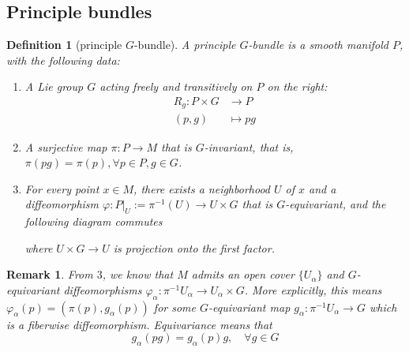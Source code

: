 \documentclass[11pt]{amsart}
\numberwithin{equation}{section}
\theoremstyle{plain}
\theoremstyle{plain}
\newtheorem{defnsub}[thmsub]{Definition}
\newtheorem{remksub}[thmsub]{Remark}
\numberwithin{equation}{section}
\begin{document}
\subsection{Principle bundles}
\begin{defnsub}[principle $G$-bundle]
A principle $G$-bundle is a smooth manifold $P$, with the following data:
\begin{enumerate}[$1.$]
\item A Lie group $G$ acting freely and transitively on $P$ on the right:
$$
\begin{aligned}
R_g:P\times G&\to P\\
(p,g)&\mapsto pg
\end{aligned}
$$
\item A surjective map $\pi:P\to M$ that is $G$-invariant, that is, $\pi(pg)=\pi(p),\forall p\in P,g\in G$.
\item For every point $x\in M$, there exists a neighborhood $U$ of $x$ and a diffeomorphism $\varphi:P|_U:=\pi^{-1}(U)\to U\times G$ that is $G$-equivariant, and the following diagram commutes
\begin{center}
\end{center}
where $U\times G\to U$ is projection onto the first factor.
\end{enumerate}
\end{defnsub}
\begin{remksub}\normalfont
From $3$, we know that $M$ admits an open cover $\{U_{\alpha}\}$ and $G$-equivariant diffeomorphisms $\varphi_{\alpha}:\pi^{-1}U_{\alpha}\to U_{\alpha}\times G$. More explicitly, this means $\varphi_{\alpha}(p)=(\pi(p),g_{\alpha}(p))$ for some $G$-equivariant map $g_{\alpha}:\pi^{-1}U_{\alpha}\to G$ which is a fiberwise diffeomorphism. Equivariance means that 
$$
g_{\alpha}(pg)=g_{\alpha}(p)g,\quad\forall g\in G
$$
\end{remksub}
\end{document}
